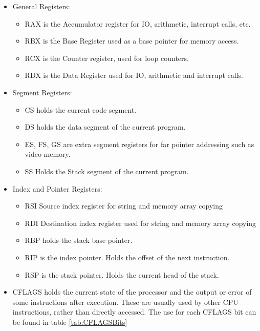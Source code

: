 \documentclass[a4paper,11pt]{report}
\begin{document}
				\begin{itemize}
					\item General Registers: 
						\begin{itemize}
							\item RAX is the Accumulator register for IO, arithmetic, interrupt calls, etc. 
							\item RBX is the Base Register used as a base pointer for memory access. 
							\item RCX is the Counter register, used for loop counters. 
							\item RDX is the Data Register used for IO, arithmetic and interrupt calls. 
						\end{itemize}
					\item Segment Registers: 
						\begin{itemize}
							\item CS holds the current code segment. 
							\item DS holds the data segment of the current program. 
							\item ES, FS, GS are extra segment registers for far pointer addressing such as video memory. 
							\item SS Holds the Stack segment of the current program. 
						\end{itemize}
					\item Index and Pointer Registers: 
						\begin{itemize}
							\item RSI Source index register for string and memory array copying
							\item RDI Destination index register used for string and memory array copying
							\item RBP holds the stack base pointer. 
							\item RIP is the index pointer. Holds the offset of the next instruction. 
							\item RSP is the stack pointer. Holds the current head of the stack. 
						\end{itemize}
					\item CFLAGS holds the current state of the processor and the output or error of some instructions after execution. 
						These are usually used by other CPU instructions, rather than directly accessed.
						The use for each CFLAGS bit can be found in table \ref{tab:CFLAGSBits} 
						\begin{table}[htb]
							\centering
							\begin{tabular}{| l | l | l |}

\end{tabular}
\end{table}
\end{itemize}
\end{document}
